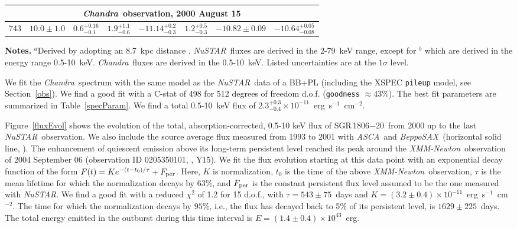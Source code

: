 \documentclass[twocolumn]{aastex6}
\newcommand {\asca} {{\it ASCA}}
\newcommand {\sax} {{\it BeppoSAX}}
\newcommand {\xmm} {\textsl{XMM-Newton}}
\newcommand {\chandra} {\textsl{Chandra}}
\newcommand {\nustar} {\textsl{NuSTAR}}
\def \src {SGR\,1806$-$20}
\begin{document}
\begin{table*}[t]
\begin{center}
{{\begin{tabular}{c c c c c c c c}
\hline
\multicolumn{8}{c}{\chandra\ observation, 2000 August 15}\\
\hline
743 \T\B & $10.0\pm1.0$  & $0.6_{-0.1}^{+0.16}$ & $1.9_{-0.6}^{+1.1}$ &$-11.14_{-0.3}^{+0.2}$& $1.2_{-0.3}^{+0.5}$&$-10.82\pm0.09$ & $-10.64_{-0.08}^{+0.05}$ \\
\hline
\end{tabular}}}
\end{center}
\begin{list}{}{}
\item[{\bf Notes.}]$^{a}$Derived by adopting an 8.7~kpc distance
  \citep{bibby08MNRAS:1806}. \nustar\ fluxes are derived in the
  2-79~keV range, except for $^b$ which are derived in the energy
  range 0.5-10~keV. \chandra\ fluxes are derived in the 0.5-10~keV.
  Listed uncertainties are at the $1\sigma$ level.
\end{list}
\end{table*}

We fit the \chandra\ spectrum with the same model as the \nustar\ data
of a BB+PL (including the XSPEC \texttt{pileup} model, see
Section~\ref{obs}). We find a good fit with a C-stat of 498 for 512
degrees of freedom d.o.f. (\texttt{goodness} $\approx43\%$). The best
fit parameters are summarized in Table~\ref{specParam}. We find a
total 0.5-10~keV flux of $2.3_{-0.4}^{+0.3}\times10^{-11}$~erg~s$^{-1}$~cm$^{-2}$.

Figure~\ref{fluxEvol} shows the evolution of the total,
absorption-corrected, 0.5-10 keV flux of \src\ from 2000 up to the 
last \nustar\ observation. We also include the source average flux
measured from 1993 to 2001 with \asca\ and \sax\ (horizontal solid
line, \citealt{woods07ApJ:1806}). The enhancement of quiescent 
emission above its long-term persistent level reached its peak around the
\xmm\ observation of 2004 September 06 (observation ID 0205350101,
\citealt{woods07ApJ:1806}, Y15). We fit the flux evolution starting
at this data point with an exponential decay function of the form
$F(t)=K e^{-(t-t_{0})/\tau}+F_{\rm per}$. Here, $K$ is normalization,
$t_{0}$ is the time of the above \xmm\ observation, $\tau$ is the mean
lifetime for which the normalization decays by $63\%$, and $F_{\rm per}$ 
is the constant persistent flux level assumed to be the one
measured with \nustar. We find a good fit with a reduced $\chi^2$ of 1.2
for 15 d.o.f., with $\tau=543\pm75$~days and
$K=(3.2\pm0.4)\times10^{-11}$~erg~s$^{-1}$~cm$^{-2}$. The time for 
which the normalization decays by $95\%$, i.e., the flux has decayed
back to 5\% of its persistent level, is $1629\pm225$~days. The total
energy emitted in the outburst during this time interval is
$E=(1.4\pm0.4)\times10^{43}$~erg. 
\end{document}
